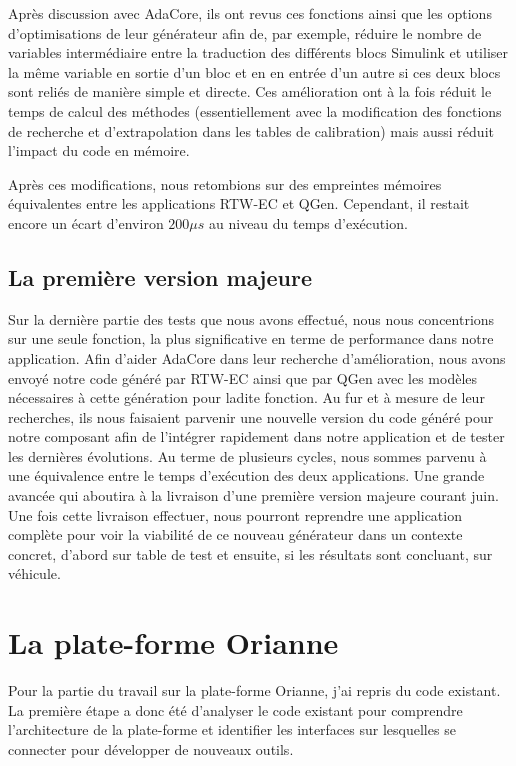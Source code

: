 Après discussion avec AdaCore, ils ont revus ces fonctions ainsi que les options d'optimisations de leur générateur afin
de, par exemple, réduire le nombre de variables intermédiaire entre la traduction des différents blocs Simulink\up{\circledR}
et utiliser la même variable en sortie d'un bloc et en en entrée d'un autre si ces deux blocs sont reliés de manière simple et directe.
Ces amélioration ont à la fois réduit le temps de calcul des méthodes (essentiellement avec la modification des fonctions de recherche
et d'extrapolation dans les tables de calibration) mais aussi réduit l'impact du code en mémoire.

Après ces modifications, nous retombions sur des empreintes mémoires équivalentes entre les applications RTW-EC\up{\circledR} et QGen.
Cependant, il restait encore un écart d'environ $200\mu{}s$ au niveau du temps d'exécution.

\subsection{La première version majeure}
Sur la dernière partie des tests que nous avons effectué, nous nous concentrions sur une seule fonction, la plus significative en terme de performance dans notre application.
Afin d'aider AdaCore dans leur recherche d'amélioration, nous avons envoyé notre code généré par RTW-EC\up{\circledR} ainsi que par QGen avec les modèles nécessaires à cette génération pour ladite fonction.
Au fur et à mesure de leur recherches, ils nous faisaient parvenir une nouvelle version du code généré pour notre composant afin de l'intégrer rapidement dans notre application et de tester les dernières évolutions.
Au terme de plusieurs cycles, nous sommes parvenu à une équivalence entre le temps d'exécution des deux applications. Une grande avancée qui aboutira à la livraison d'une première version majeure courant juin.
Une fois cette livraison effectuer, nous pourront reprendre une application complète pour voir la viabilité de ce nouveau générateur dans un contexte concret, d'abord sur table de test et ensuite, si les résultats sont concluant, sur véhicule.

\section{La plate-forme Orianne}
Pour la partie du travail sur la plate-forme Orianne, j'ai repris du code existant.
La première étape a donc été d'analyser le code existant pour comprendre
l'architecture de la plate-forme et identifier les interfaces sur lesquelles se
connecter pour développer de nouveaux outils.

